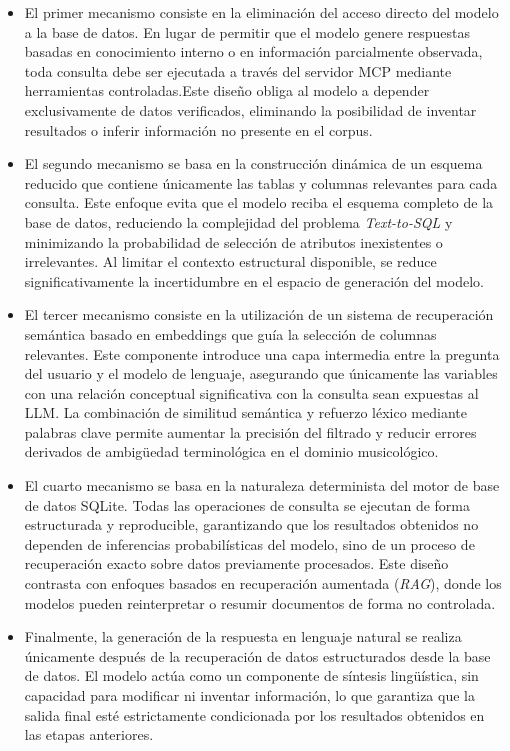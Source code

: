 \begin{itemize}
    \item El primer mecanismo consiste en la eliminación del acceso directo del modelo a la base de datos. En lugar de permitir que el modelo genere respuestas basadas en conocimiento interno o en información parcialmente observada, toda consulta debe ser ejecutada a través del servidor MCP mediante herramientas controladas.Este diseño obliga al modelo a depender exclusivamente de datos verificados, eliminando la posibilidad de inventar resultados o inferir información no presente en el corpus.
    \item El segundo mecanismo se basa en la construcción dinámica de un esquema reducido que contiene únicamente las tablas y columnas relevantes para cada consulta. Este enfoque evita que el modelo reciba el esquema completo de la base de datos, reduciendo la complejidad del problema \textit{Text-to-SQL} y minimizando la probabilidad de selección de atributos inexistentes o irrelevantes. Al limitar el contexto estructural disponible, se reduce significativamente la incertidumbre en el espacio de generación del modelo.
    \item El tercer mecanismo consiste en la utilización de un sistema de recuperación semántica basado en embeddings que guía la selección de columnas relevantes. Este componente introduce una capa intermedia entre la pregunta del usuario y el modelo de lenguaje, asegurando que únicamente las variables con una relación conceptual significativa con la consulta sean expuestas al LLM. La combinación de similitud semántica y refuerzo léxico mediante palabras clave permite aumentar la precisión del filtrado y reducir errores derivados de ambigüedad terminológica en el dominio musicológico.
    \item El cuarto mecanismo se basa en la naturaleza determinista del motor de base de datos SQLite. Todas las operaciones de consulta se ejecutan de forma estructurada y reproducible, garantizando que los resultados obtenidos no dependen de inferencias probabilísticas del modelo, sino de un proceso de recuperación exacto sobre datos previamente procesados. Este diseño contrasta con enfoques basados en recuperación aumentada (\textit{RAG}), donde los modelos pueden reinterpretar o resumir documentos de forma no controlada.
    \item Finalmente, la generación de la respuesta en lenguaje natural se realiza únicamente después de la recuperación de datos estructurados desde la base de datos. El modelo actúa como un componente de síntesis lingüística, sin capacidad para modificar ni inventar información, lo que garantiza que la salida final esté estrictamente condicionada por los resultados obtenidos en las etapas anteriores.
\end{itemize} 


